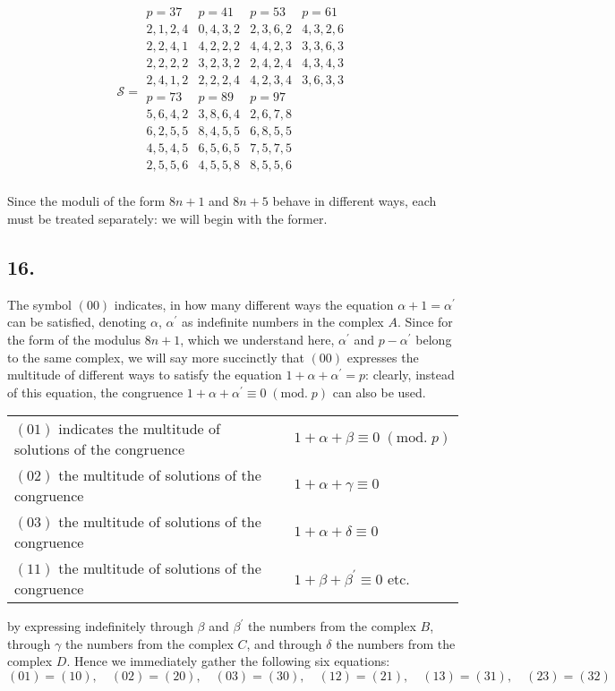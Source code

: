 \documentclass[twoside,12pt, showframe]{memoir}
\renewcommand{\pmod}[1]{\;(\textrm{mod.}\;#1)}
\begin{document}
\[
\mathcal{S} = 
\begin{array}{c|c|c|c}
p=37 & p=41 & p=53 & p=61 \\
2, 1, 2, 4 & 0, 4, 3, 2 & 2, 3, 6, 2 & 4, 3, 2, 6 \\
2, 2, 4, 1 & 4, 2, 2, 2 & 4, 4, 2, 3 & 3, 3, 6, 3 \\
2, 2, 2, 2 & 3, 2, 3, 2 & 2, 4, 2, 4 & 4, 3, 4, 3 \\
2, 4, 1, 2 & 2, 2, 2, 4 & 4, 2, 3, 4 & 3, 6, 3, 3 \\
\hline
p=73 & p=89 & p=97   \\
5, 6, 4, 2 & 3, 8, 6, 4 & 2, 6, 7, 8   \\
6, 2, 5, 5 & 8, 4, 5, 5 & 6, 8, 5, 5   \\
4, 5, 4, 5 & 6, 5, 6, 5 & 7, 5, 7, 5   \\
2, 5, 5, 6 & 4, 5, 5, 8 & 8, 5, 5, 6   \\
\end{array}
\]

Since the moduli of the form \(8n+1\) and \(8n+5\) behave in different ways, each must be treated separately: we will begin with the former.
%

\subsection*{16.}
 
The symbol \((00)\) indicates, in how many different ways the equation \(\alpha+1=\alpha^{\prime}\) can be satisfied, denoting \(\alpha\), \(\alpha^{\prime}\) as indefinite numbers in the complex \(A\). Since for the form of the modulus \(8n+1\), which we understand here, \(\alpha^{\prime}\) and \(p-\alpha^{\prime}\) belong to the same complex, we will say more succinctly that \((00)\) expresses the multitude of different ways to satisfy the equation \(1+\alpha+\alpha^{\prime}=p\): clearly, instead of this equation, the congruence \(1+\alpha+\alpha^{\prime} \equiv 0 \pmod{p}\) can also be used.
%

\begin{center}
\begin{tabular}{ll}
\((01)\) indicates the multitude of solutions of the congruence & \(1+\alpha+\beta \equiv 0\pmod{p}\) \\
\((02)\) the multitude of solutions of the congruence& \(1+\alpha+\gamma \equiv 0\) \\
\((03)\) the multitude of solutions of the congruence& \(1+\alpha+\delta \equiv 0\) \\
\((11)\) the multitude of solutions of the congruence& \(1+\beta+\beta^{\prime} \equiv 0\) etc. \\
\end{tabular}
\end{center}
by expressing indefinitely through \(\beta\) and \(\beta^{\prime}\) the numbers from the complex \(B\), through \(\gamma\) the numbers from the complex \(C\), and through \(\delta\) the numbers from the complex \(D\). Hence we immediately gather the following six equations:
\[(01)=(10), \quad (02)=(20), \quad (03)=(30), \quad (12)=(21), \quad(13)=(31), \quad(23)=(32)\]
%
\end{document}
